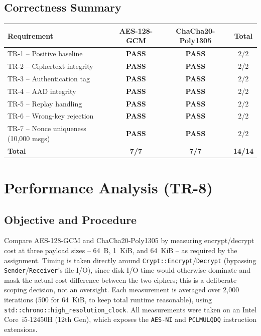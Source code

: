 \documentclass[11pt]{article}
\newcommand{\PASS}{\textcolor{passgreen}{\textbf{PASS}}}
\begin{document}
\subsection*{Correctness Summary}
\begin{center}
\begin{tabular}{lccc}
\toprule
\textbf{Requirement} & \textbf{AES-128-GCM} & \textbf{ChaCha20-Poly1305} & \textbf{Total} \\
\midrule
TR-1 -- Positive baseline & \PASS & \PASS & 2/2 \\
TR-2 -- Ciphertext integrity & \PASS & \PASS & 2/2 \\
TR-3 -- Authentication tag & \PASS & \PASS & 2/2 \\
TR-4 -- AAD integrity & \PASS & \PASS & 2/2 \\
TR-5 -- Replay handling & \PASS & \PASS & 2/2 \\
TR-6 -- Wrong-key rejection & \PASS & \PASS & 2/2 \\
TR-7 -- Nonce uniqueness (10{,}000 msgs) & \PASS & \PASS & 2/2 \\
\midrule
\textbf{Total} & \textbf{7/7} & \textbf{7/7} & \textbf{14/14} \\
\bottomrule
\end{tabular}
\end{center}

\section{Performance Analysis (TR-8)}

\subsection*{Objective and Procedure}
Compare AES-128-GCM and ChaCha20-Poly1305 by measuring encrypt/decrypt cost at three
payload sizes -- 64~B, 1~KiB, and 64~KiB -- as required by the assignment. Timing is
taken directly around \texttt{Crypt::Encrypt}/\texttt{Decrypt} (bypassing
\texttt{Sender}/\texttt{Receiver}'s file I/O), since disk I/O time would otherwise
dominate and mask the actual cost difference between the two ciphers; this is a
deliberate scoping decision, not an oversight. Each measurement is averaged over 2{,}000
iterations (500 for 64~KiB, to keep total runtime reasonable), using
\texttt{std::chrono::high\_resolution\_clock}. All measurements were taken on an Intel
Core~i5-12450H (12th Gen), which exposes the \texttt{AES-NI} and \texttt{PCLMULQDQ}
instruction extensions.
\end{document}
